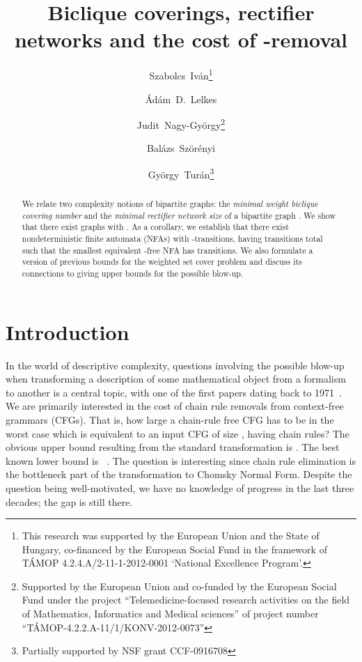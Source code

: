 \documentclass[submission]{llncs}
\title{Biclique coverings, rectifier networks and the cost of -removal}
\author{
Szabolcs~Iv\'an\inst{1}\thanks{This research was supported by the European Union and the State of Hungary, co-financed by the European Social Fund in the framework of T\'AMOP 4.2.4.A/2-11-1-2012-0001 ‘National Excellence Program’.}
\and \'Ad\'am~D.~Lelkes\inst{2}
\and Judit~Nagy-Gy\"orgy\inst{1}\thanks{Supported by the European Union and co-funded by the European Social Fund under the project ``Telemedicine-focused research activities on the field of Mathematics, Informatics and Medical sciences'' of project number ``T\'AMOP-4.2.2.A-11/1/KONV-2012-0073''}
\and Bal\'azs~Sz\"or\'enyi\inst{3,4}
\and Gy\"orgy~Tur\'an\inst{2,3}\thanks{Partially supported by NSF grant CCF-0916708}
}
\institute{
	University of Szeged, Hungary
	\and	
	University of Illinois at Chicago
	\and
	MTA-SZTE Research Group on Artificial Intelligence
	\and
	INRIA Lille, SequeL project, France
}
\begin{document}
\maketitle

\begin{abstract}
We relate two complexity notions of bipartite graphs: the \emph{minimal weight biclique covering number}  and
the \emph{minimal rectifier network size}  of a bipartite graph .
We show that there exist graphs with .
As a corollary, we establish that there exist nondeterministic finite automata (NFAs) with -transitions,
having  transitions total such that the smallest equivalent -free NFA has  transitions.
We also formulate a version of previous bounds for the weighted set cover problem and discuss its connections
to giving upper bounds for the possible blow-up.
\end{abstract}

\section{Introduction}
\label{sec-intro}
  In the world of descriptive complexity, questions involving the possible blow-up when transforming a description of some mathematical
  object from a formalism to another is a central topic, with one of the first papers dating back to 1971~\cite{conf/focs/MeyerF71}.
  We are primarily interested in the cost of chain rule removals from context-free grammars (CFGs).
  That is, how large a chain-rule free CFG has to be in the worst case which is equivalent to an input CFG of size , having chain rules?
  The obvious upper bound resulting from the standard transformation is .
  The best known lower bound is ~\cite{Blum1983287}.
  The question is interesting since chain rule elimination is the bottleneck part of the transformation to Chomsky Normal Form.
  Despite the question being well-motivated, we have no knowledge of progress in the last three decades; the gap is still there.
\end{document}
